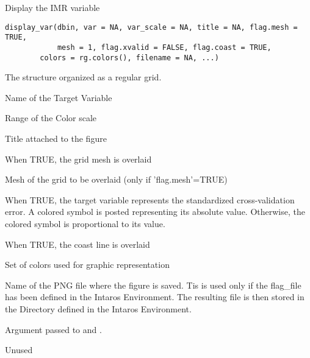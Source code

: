 %
\begin{Description}\relax
Display the IMR variable
\end{Description}
%
\begin{Usage}
\begin{verbatim}
display_var(dbin, var = NA, var_scale = NA, title = NA, flag.mesh = TRUE,
            mesh = 1, flag.xvalid = FALSE, flag.coast = TRUE,
	    colors = rg.colors(), filename = NA, ...)
\end{verbatim}
\end{Usage}
%
\begin{Arguments}
\begin{ldescription}
\item[\code{dbin}] 
The  structure organized as a regular grid.

\item[\code{var}] 
Name of the Target Variable

\item[\code{var\_scale}] 
Range of the Color scale

\item[\code{title}] 
Title attached to the figure

\item[\code{flag.mesh}] 
When TRUE, the grid mesh is overlaid

\item[\code{mesh}] 
Mesh of the grid to be overlaid (only if 'flag.mesh'=TRUE)

\item[\code{flag.xvalid}] 
When TRUE, the target variable represents the standardized cross-validation
error. A colored symbol is posted representing its absolute value.
Otherwise, the colored symbol is proportional to its value.

\item[\code{flag.coast}] 
When TRUE, the coast line is overlaid

\item[\code{colors}] 
Set of colors used for graphic representation

\item[\code{filename}] 
Name of the PNG file where the figure is saved. Tis is used only if
the flag\_file has been defined in the Intaros Environment.
The resulting file is then stored in the Directory defined in the
Intaros Environment.

\item[\code{...}] 
Argument passed to  and
.

\end{ldescription}
\end{Arguments}
%
\begin{Value}
Unused
\end{Value}
